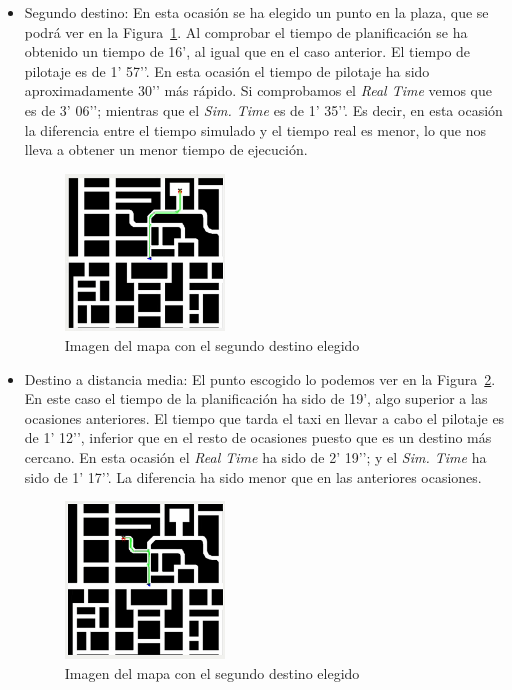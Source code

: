\begin{itemize}
\item Segundo destino: En esta ocasión se ha elegido un punto en la plaza, que se podrá ver en la Figura~\ref{fig.experimento2}. Al comprobar el tiempo de planificación se ha obtenido un tiempo de 16’, al igual que en el caso anterior. El tiempo de pilotaje es de 1’ 57’’. En esta ocasión el tiempo de pilotaje ha sido aproximadamente 30’’ más rápido. Si comprobamos el \textit{Real Time} vemos que es de 3’ 06’’; mientras que el \textit{Sim. Time} es de 1’ 35’’. Es decir, en esta ocasión la diferencia entre el tiempo simulado y el tiempo real es menor, lo que nos lleva a obtener un menor tiempo de ejecución.

\begin{figure}[H]
  \begin{center}
    \includegraphics[width=0.4\textwidth]{figures/GPP/Experimento2.png}
		\caption{Imagen del mapa con el segundo destino elegido}
		\label{fig.experimento2}
		\end{center}
\end{figure}

\item Destino a distancia media: El punto escogido lo podemos ver en la Figura~\ref{fig.experimento3}. En este caso el tiempo de la planificación ha sido de 19’, algo superior a las ocasiones anteriores. El tiempo que tarda el taxi en llevar a cabo el pilotaje es de 1’ 12’’, inferior que en el resto de ocasiones puesto que es un destino más cercano. En esta ocasión el \textit{Real Time} ha sido de 2’ 19’’; y el \textit{Sim. Time} ha sido de 1’ 17’’. La diferencia ha sido menor que en las anteriores ocasiones.

\begin{figure}[H]
  \begin{center}
    \includegraphics[width=0.4\textwidth]{figures/GPP/Experimento3.png}
		\caption{Imagen del mapa con el segundo destino elegido}
		\label{fig.experimento3}
		\end{center}
\end{figure}
\end{itemize}

